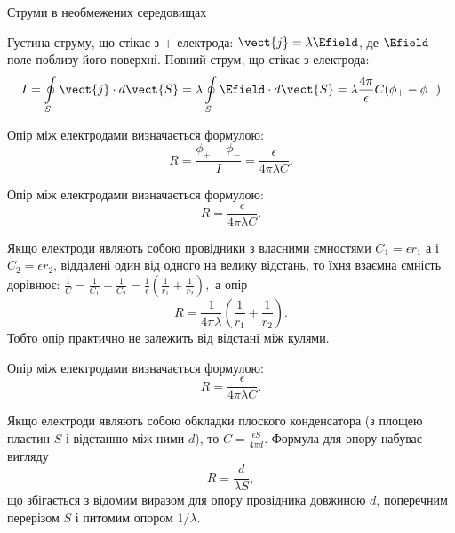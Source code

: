 \documentclass[onlytextwidth]{beamer}
\begin{document}
\begin{frame}{Струми в необмежених середовищах}{}
\begin{overprint}
\begin{block}{}
			Густина струму, що стікає з $+$ електрода: $\vect{j} = \lambda\Efield$, де $\Efield$ --- поле поблизу його поверхні. Повний струм,
			що стікає з електрода:
			\begin{equation*}
				I = \oint\limits_S \vect{j}\cdot d\vect{S} = \lambda \oint\limits_S \Efield\cdot d\vect{S} = \lambda \frac{4\pi}{\epsilon}
				C(\phi_+
				- \phi_-)
			\end{equation*}
		\end{block}
		\begin{block}{}
			Опір між електродами визначається формулою:
			\begin{equation*}
				R = \frac{\phi_+ - \phi_-}{I} = \frac{\epsilon}{4\pi\lambda C}.
			\end{equation*}
		\end{block}
		\begin{block}{}
			Опір між електродами визначається формулою:
			\begin{equation*}
				R = \frac{\epsilon}{4\pi\lambda C}.
			\end{equation*}
		\end{block}
		\begin{block}{}\justifying
			Якщо електроди являють собою провідники з власними ємностями $C_1 = \epsilon r_1$ а і $C_2 = \epsilon r_2$, віддалені один від одного на
			велику
			відстань, то їхня взаємна ємність дорівнює:
			\(
			\frac1{C} = \frac1{C_1}  + \frac1{C_2}  = \frac1\epsilon\left(\frac1{r_1} + \frac1{r_2}\right),
			\)
			а опір
			\begin{equation*}
				R = \frac1{4\pi\lambda}\left(\frac1{r_1} + \frac1{r_2}\right).
			\end{equation*}
			Тобто опір практично не залежить від відстані між кулями.
		\end{block}
		\begin{block}{}
			Опір між електродами визначається формулою:
			\begin{equation*}
				R = \frac{\epsilon}{4\pi\lambda C}.
			\end{equation*}
		\end{block}
		\begin{block}{}\justifying
			Якщо електроди являють собою обкладки плоского конденсатора (з площею пластин $S$ і відстанню між ними $d$), то $ C= \frac{\epsilon
					S}{4\pi d} $.
			Формула для опору набуває вигляду
			\begin{equation*}
				R = \frac{d}{\lambda S},
			\end{equation*}
			що збігається з відомим виразом для опору провідника довжиною $d$, поперечним перерізом $S$ і
			питомим опором $1/\lambda$.
		\end{block}
	\end{overprint}
\end{frame}
\end{document}
